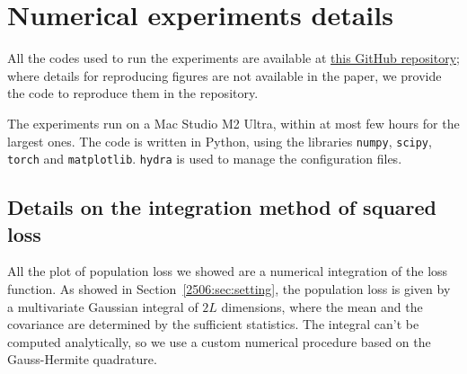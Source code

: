 \section{Numerical experiments details} \label{2506:app:numerical-details}
All the codes used to run the experiments are available at \href{https://github.com/IdePHICS/Sequence-Single-Index}{this GitHub repository}; where details for reproducing figures are not available in the paper, we provide the code to reproduce them in the repository.

The experiments run on a Mac Studio M2 Ultra, within at most few hours for the largest ones. The code is written in Python, using the libraries \texttt{numpy}, \texttt{scipy}, \texttt{torch} and \texttt{matplotlib}. \texttt{hydra} is used to manage the configuration files.


\subsection{Details on the integration method of squared loss}
All the plot of population loss we showed are a numerical integration of the loss function. As showed in Section~\ref{2506:sec:setting}, the population loss is given by a multivariate Gaussian integral of \(2L\) dimensions, where the mean and the covariance are determined by the sufficient statistics. The integral can't be computed analytically, so we use a custom numerical procedure based on the Gauss-Hermite quadrature.

